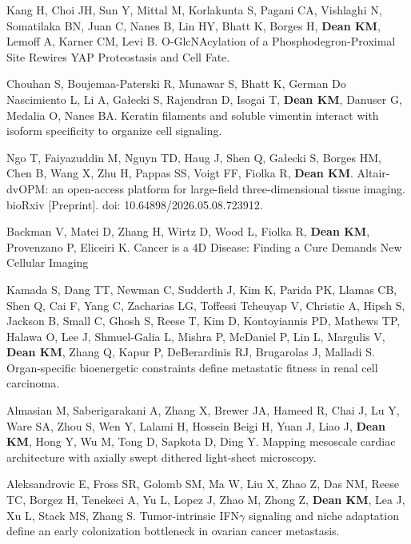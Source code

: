\begin{etaremune}
\item Kang H, Choi JH, Sun Y, Mittal M, Korlakunta S, Pagani CA, Vishlaghi N, Somatilaka BN, Juan C, Nanes B, Lin HY, Bhatt K, Borges H, \textbf{Dean KM}, Lemoff A, Karner CM, Levi B. O-GlcNAcylation of a Phosphodegron-Proximal Site Rewires YAP Proteostasis and Cell Fate.

\item Chouhan S, Boujemaa-Paterski R, Munawar S, Bhatt K, German Do Nascimiento L, Li A, Ga\l{}ecki S, Rajendran D, Isogai T, \textbf{Dean KM}, Danuser G, Medalia O, Nanes BA. Keratin filaments and soluble vimentin interact with isoform specificity to organize cell signaling.

\item Ngo T, Faiyazuddin M, Nguyn TD, Haug J, Shen Q, Ga\l{}ecki S, Borges HM, Chen B, Wang X, Zhu H, Pappas SS, Voigt FF, Fiolka R, \textbf{Dean KM}. Altair-dvOPM: an open-access platform for large-field three-dimensional tissue imaging. bioRxiv [Preprint]. doi: 10.64898/2026.05.08.723912.

\item Backman V, Matei D, Zhang H, Wirtz D, Wood L, Fiolka R, \textbf{Dean KM}, Provenzano P, Eliceiri K. Cancer is a 4D Disease: Finding a Cure Demands New Cellular Imaging

\item Kamada S, Dang TT, Newman C, Sudderth J, Kim K, Parida PK, Llamas CB, Shen Q, Cai F, Yang C, Zacharias LG, Toffessi Tcheuyap V, Christie A, Hipsh S, Jackson B, Small C, Ghosh S, Reese T, Kim D, Kontoyiannis PD, Mathews TP, Halawa O, Lee J, Shmuel-Galia L, Mishra P, McDaniel P, Lin L, Margulis V, \textbf{Dean KM}, Zhang Q, Kapur P, DeBerardinis RJ, Brugarolas J, Malladi S. Organ-specific bioenergetic constraints define metastatic fitness in renal cell carcinoma.

\item Almasian M, Saberigarakani A, Zhang X, Brewer JA, Hameed R, Chai J, Lu Y, Ware SA, Zhou S, Wen Y, Lalami H, Hossein Beigi H, Yuan J, Liao J, \textbf{Dean KM}, Hong Y, Wu M, Tong D, Sapkota D, Ding Y. Mapping mesoscale cardiac architecture with axially swept dithered light-sheet microscopy.

\item Aleksandrovic E, Fross SR, Golomb SM, Ma W, Liu X, Zhao Z, Das NM, Reese TC, Borgez H, Tenekeci A, Yu L, Lopez J, Zhao M, Zhong Z, \textbf{Dean KM}, Lea J, Xu L, Stack MS, Zhang S. Tumor-intrinsic IFN$\gamma$ signaling and niche adaptation define an early colonization bottleneck in ovarian cancer metastasis.


\end{etaremune}

